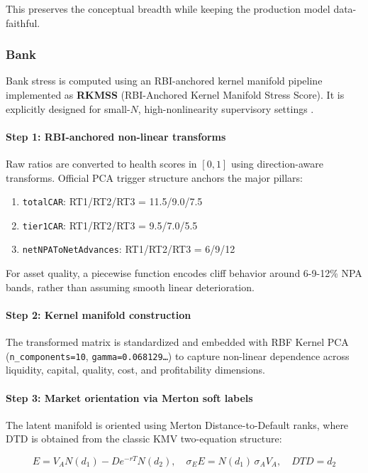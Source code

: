 This preserves the conceptual breadth while keeping the production model data-faithful.

\subsubsection{Bank}

Bank stress is computed using an RBI-anchored kernel manifold pipeline implemented as \textbf{RKMSS} (RBI-Anchored Kernel Manifold Stress Score). It is explicitly designed for small-$N$, high-nonlinearity supervisory settings \cite{ref8} \cite{ref9}.

\paragraph{Step 1: RBI-anchored non-linear transforms}
Raw ratios are converted to health scores in $[0,1]$ using direction-aware transforms. Official PCA trigger structure anchors the major pillars:

\begin{enumerate}
  \item \texttt{totalCAR}: RT1/RT2/RT3 = 11.5/9.0/7.5
  \item \texttt{tier1CAR}: RT1/RT2/RT3 = 9.5/7.0/5.5
  \item \texttt{netNPAToNetAdvances}: RT1/RT2/RT3 = 6/9/12
\end{enumerate}

For asset quality, a piecewise function encodes cliff behavior around 6-9-12\% NPA bands, rather than assuming smooth linear deterioration.

\paragraph{Step 2: Kernel manifold construction}
The transformed matrix is standardized and embedded with RBF Kernel PCA (\texttt{n\_components=10}, \texttt{gamma=0.068129\dots}) to capture non-linear dependence across liquidity, capital, quality, cost, and profitability dimensions.

\paragraph{Step 3: Market orientation via Merton soft labels}
The latent manifold is oriented using Merton Distance-to-Default ranks, where DTD is obtained from the classic KMV two-equation structure:

\begin{equation}
  E = V_A N(d_1) - D e^{-rT} N(d_2), \quad
  \sigma_E E = N(d_1)\,\sigma_A V_A, \quad
  DTD = d_2
\end{equation}

